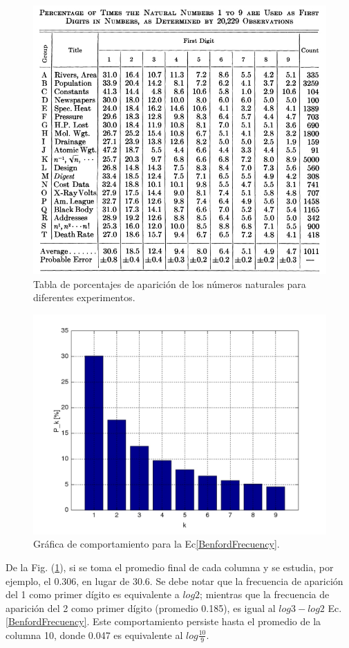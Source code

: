 \begin{figure}[h]
	\centering
	\includegraphics[scale=0.4]{figures/benford_table.jpg}
	\caption{Tabla de porcentajes de aparici\'on de los n\'umeros naturales para diferentes experimentos.}
	\label{T1Benford}
\end{figure}

\begin{figure}[h]
	\centering
	\includegraphics[scale=0.4]{figures/benford_frequency.jpg}
\caption{Gr\'afica de comportamiento para la Ec\eqref{BenfordFrecuency}.}
	\label{G1Benford}
\end{figure}
De la Fig. (\ref{T1Benford}), si se toma el promedio final de cada columna y se
estudia, por ejemplo, el 0.306, en lugar de 30.6. Se debe notar que la
frecuencia de aparici\'on del 1 como primer dígito es equivalente a $log 2$;
mientras que la frecuencia de aparici\'on del 2 como primer d\'igito (promedio
0.185), es igual al $log 3-log 2$ Ec.\eqref{BenfordFrecuency}. Este
comportamiento persiste hasta el promedio de la columna 10, donde 0.047 es
equivalente al $log \frac{10}{9}$.

